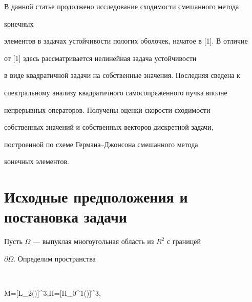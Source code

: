 \date{}







\pagestyle{plain} %













\maketitle


\label{begin}





В данной статье продолжено исследование сходимости смешанного метода


конечных


элементов в задачах устойчивости пологих оболочек, начатое в [1]. В отличие


от [1] здесь рассматривается нелинейная задача устойчивости


в виде квадратичной задачи на собственные значения. Последняя сведена к


спектральному анализу квадратичного самосопряженного пучка вполне 


непрерывных операторов. Получены оценки скорости сходимости 


собственных значений и собственных векторов дискретной задачи,


построенной по схеме Германа--Джонсона смешанного метода


конечных элементов.





\section{Исходные предположения и постановка задачи}  





Пусть $\Omega$ --- выпуклая многоугольная область из $R^2$ с границей


$\partial \Omega$. Определим пространства


$$


M=[L_{2}(\Omega)]^3,\quad H=[H_0^1(\Omega)]^3,\quad


